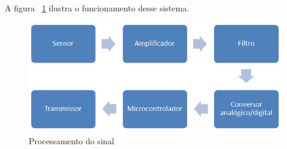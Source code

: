 \begin{enumerate}
	
	A figura ~\ref{funcionamento_microcontrolador} ilustra o funcionamento desse sistema.
	
	\begin{figure}[!h]
	  \centering
	  \includegraphics[scale=0.6]{editaveis/figuras/funcionamento_microcontrolador}
	  \caption[Processamento do sinal]{Processamento do sinal}
	  \FloatBarrier
	  \label{funcionamento_microcontrolador}
	\end{figure}
	
  \end{enumerate}
  
  \vfill